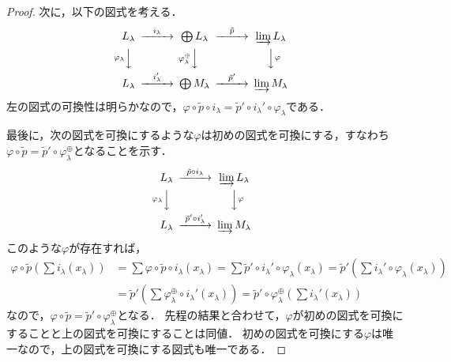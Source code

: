 \begin{proof}
  次に，以下の図式を考える．
  \[
  \begin{CD}
    L_\lambda  @>{i_\lambda}>> \bigoplus L_\lambda @>{\tilde{p}}>> \varinjlim L_\lambda \\
    @V{\varphi_\lambda}VV  @V{\varphi_\lambda^\oplus}VV  @VV{\varphi}V \\
    L_\lambda  @>{i_\lambda'}>> \bigoplus M_\lambda @>{\tilde{p}'}>> \varinjlim M_\lambda \\
  \end{CD}
  \]
  左の図式の可換性は明らかなので，$\varphi \circ \tilde{p} \circ i_\lambda = \tilde{p}' \circ i_\lambda' \circ \varphi_\lambda$である．

  最後に，次の図式を可換にするような$\varphi$は初めの図式を可換にする，すなわち$\varphi \circ \tilde{p} = \tilde{p}' \circ \varphi_\lambda^\oplus$となることを示す．
  \[
  \begin{CD}
    L_\lambda  @>{\tilde{p} \circ i_\lambda}>> \varinjlim L_\lambda \\
    @V{\varphi_\lambda}VV   @VV{\varphi}V \\
    L_\lambda  @>{\tilde{p}' \circ i_\lambda'}>> \varinjlim M_\lambda \\
  \end{CD}
  \]
  このような$\varphi$が存在すれば，
  \begin{align*}
    \varphi \circ \tilde{p} \left( \sum i_\lambda(x_\lambda) \right) &= \sum \varphi \circ \tilde{p} \circ i_\lambda (x_\lambda) = \sum \tilde{p}' \circ i_\lambda' \circ \varphi_\lambda (x_\lambda) = \tilde{p}' \left( \sum i_\lambda' \circ \varphi_\lambda (x_\lambda) \right) \\
    &= \tilde{p}' \left( \sum \varphi_\lambda^\oplus \circ i_\lambda' (x_\lambda) \right) = \tilde{p}' \circ \varphi_\lambda^\oplus \left( \sum i_\lambda' (x_\lambda) \right)
  \end{align*}
  なので，$\varphi \circ \tilde{p} = \tilde{p}' \circ \varphi_\lambda^\oplus$となる．
  先程の結果と合わせて，$\varphi$が初めの図式を可換にすることと上の図式を可換にすることは同値．
  初めの図式を可換にする$\varphi$は唯一なので，上の図式を可換にする図式も唯一である．
\end{proof}

